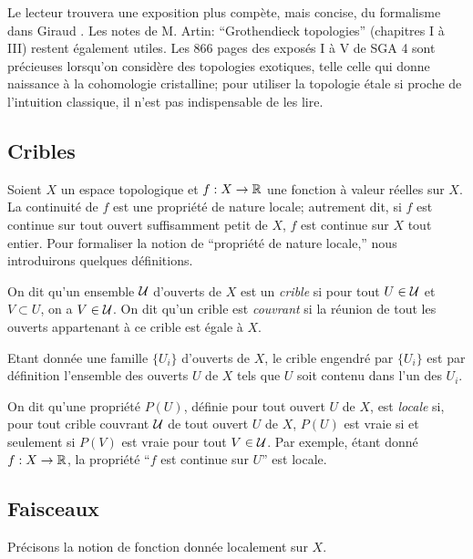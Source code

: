 \documentclass[oneside]{book}
\begin{document}
Le lecteur trouvera une exposition plus compète, mais concise, du 
formalisme dans Giraud \cite{Gi}. Les notes de M. Artin: ``Grothendieck 
topologies'' \cite{Ar} (chapitres I à III) restent également utiles. Les 
866 pages des exposés I à V de SGA 4 sont précieuses lorsqu'on 
considère des topologies exotiques, telle celle qui donne naissance à la 
cohomologie cristalline; pour utiliser la topologie étale si proche de 
l'intuition classique, il n'est pas indispensable de les lire. 










\subsection{Cribles}\label{I:1-1}

Soient $X$ un espace topologique et $f:X\to \mathbb{R}$ une fonction à valeur 
réelles sur $X$. La continuité de $f$ est une propriété de nature 
locale; autrement dit, si $f$ est continue sur tout ouvert suffisamment petit 
de $X$, $f$ est continue sur $X$ tout entier. Pour formaliser la notion de 
``propriété de nature locale,'' nous introduirons quelques définitions.

On dit qu'un ensemble $\mathcal{U}$ d'ouverts de $X$ est un \emph{crible} si pour tout 
$U\in\mathcal{U}$ et $V\subset U$, on a $V\in\mathcal{U}$. On dit qu'un crible est 
\emph{couvrant} si la réunion de tout les ouverts appartenant à ce crible est 
égale à $X$.

Etant donnée une famille $\{U_i\}$ d'ouverts de $X$, le crible engendré par 
$\{U_i\}$ est par définition l'ensemble des ouverts $U$ de $X$ tels que $U$ 
soit contenu dans l'un des $U_i$. 

On dit qu'une propriété $P(U)$, définie pour tout ouvert $U$ de $X$, est 
\emph{locale} si, pour tout crible couvrant $\mathcal{U}$ de tout ouvert $U$ de $X$, 
$P(U)$ est vraie si et seulement si $P(V)$ est vraie pour tout $V\in \mathcal{U}$. Par 
exemple, étant donné $f:X\to \mathbb{R}$, la propriété ``$f$ est continue sur $U$'' 
est locale. 





\subsection{Faisceaux}\label{I:1-2}

Précisons la notion de fonction donnée localement sur $X$.
\end{document}
